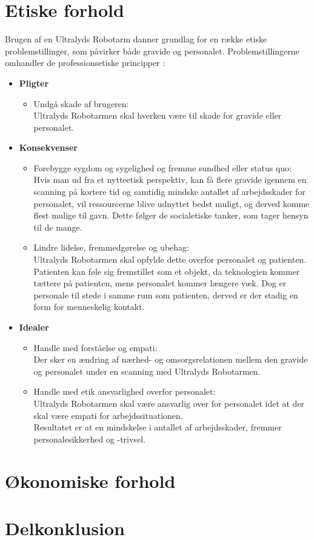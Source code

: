 \section{Etiske forhold}
Brugen af en Ultralyds Robotarm danner grundlag for en række etiske problemstillinger, som påvirker både gravide og personalet. 
Problemstillingerne omhandler de professionsetiske principper \cite{Husted}: 
\begin{itemize}
	\item \textbf{Pligter}
	\begin{itemize}
		\item Undgå skade af brugeren:\\ 
		Ultralyds Robotarmen skal hverken være til skade for gravide eller personalet. 
	\end{itemize} 
	\item \textbf{Konsekvenser}
	\begin{itemize}
		\item Forebygge sygdom og sygelighed og fremme sundhed eller status quo: \\
		Hvis man ud fra et nytteetisk perspektiv, kan få flere gravide igennem en scanning på kortere tid og samtidig mindske antallet af arbejdsskader for personalet, vil ressourcerne blive udnyttet bedst muligt, og derved komme flest mulige til gavn. Dette følger de socialetiske tanker, som tager hensyn til de mange.    
		\item Lindre lidelse, fremmedgørelse og ubehag:\\
		Ultralyds Robotarmen skal opfylde dette overfor personalet og patienten. Patienten kan føle sig fremstillet som et objekt,  da teknologien kommer tættere på patienten, mens personalet kommer længere væk. Dog er personale til stede i samme rum som patienten, derved er der stadig en form for menneskelig kontakt.  
	\end{itemize}
	\item \textbf{Idealer}
	\begin{itemize}
		\item Handle med forståelse og empati:\\
		Der sker en ændring af nærhed- og omsorgsrelationen mellem den gravide og personalet under en scanning med Ultralyds Robotarmen. 
		\item Handle med etik ansvarlighed overfor personalet:\\
		Ultralyds Robotarmen skal være ansvarlig over for personalet idet at der skal være empati for arbejdssituationen.\\
		Resultatet er at en mindskelse i antallet af arbejdsskader, fremmer personalesikkerhed og -trivsel.   		
	\end{itemize} 
\end{itemize} 

\section{Økonomiske forhold}

\section{Delkonklusion }